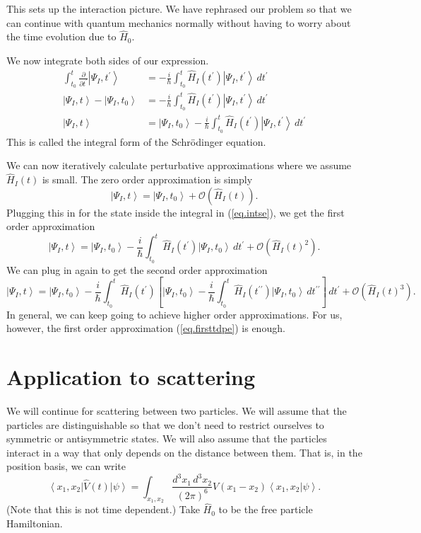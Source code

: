 \documentclass[11pt]{article}
\newcommand{\Od}[1]{\mathcal{O}{\left(#1\right)}}
\newcommand{\bra}[1]{\left\langle#1\right|}
\newcommand{\ket}[1]{\left|#1\right\rangle}
\newcommand{\braket}[2]{\left\langle#1|#2\right\rangle}
\newcommand{\op}[1]{\hat{#1}}
\theoremstyle{theorem}
\theoremstyle{remark}
\theoremstyle{step}
\theoremstyle{gap}
\begin{document}
This sets up the interaction picture. We have rephrased our problem so that we can continue with quantum mechanics normally without having to worry about the time evolution due to \(\op{H}_0\).

We now integrate both sides of our expression.
\begin{align}
\int_{t_0}^t \frac{\partial}{\partial t^\prime} \ket{\Psi_I, t^\prime} &= -\frac{i}{\hbar} \int_{t_0}^t \op{H}_I(t^\prime)\ket{\Psi_I, t^\prime} \,dt^\prime \nonumber\\
\ket{\Psi_I, t} - \ket{\Psi_I, t_0} &= -\frac{i}{\hbar} \int_{t_0}^t \op{H}_I(t^\prime)\ket{\Psi_I, t^\prime} \,dt^\prime \nonumber\\
\ket{\Psi_I, t} &= \ket{\Psi_I, t_0} - \frac{i}{\hbar} \int_{t_0}^t \op{H}_I(t^\prime)\ket{\Psi_I, t^\prime} \,dt^\prime \label{eq.intse}
\end{align}
This is called the integral form of the Schr\"odinger equation.

We can now iteratively calculate perturbative approximations where we assume \(\op{H}_I(t)\) is small. The zero order approximation is simply
\[\ket{\Psi_I, t} = \ket{\Psi_I, t_0} + \Od{\op{H}_I(t)}.\]
Plugging this in for the state inside the integral in (\ref{eq.intse}), we get the first order approximation
\begin{equation}\label{eq.firsttdpe}
\ket{\Psi_I, t} = \ket{\Psi_I, t_0} - \frac{i}{\hbar} \int_{t_0}^t \op{H}_I(t^\prime)\ket{\Psi_I, t_0} \,dt^\prime + \Od{\op{H}_I(t)^2}.
\end{equation}
We can plug in again to get the second order approximation
\[
\ket{\Psi_I, t} = \ket{\Psi_I, t_0} - \frac{i}{\hbar} \int_{t_0}^t \op{H}_I(t^\prime)\left[\ket{\Psi_I, t_0} - \frac{i}{\hbar} \int_{t_0}^t \op{H}_I(t^{\prime\prime})\ket{\Psi_I, t_0} \,dt^{\prime\prime}\right] \,dt^\prime + \Od{\op{H}_I(t)^3}.
\]
In general, we can keep going to achieve higher order approximations. For us, however, the first order approximation (\ref{eq.firsttdpe}) is enough.

\section{Application to scattering}

We will continue for scattering between two particles. We will assume that the particles are distinguishable so that we don't need to restrict ourselves to symmetric or antisymmetric states. We will also assume that the particles interact in a way that only depends on the distance between them. That is, in the position basis, we can write \[\bra{x_1, x_2}\op{V}(t)\ket{\psi} = \int_{x_1,x_2} \frac{d^3 x_1 \,d^3x_2}{(2\pi)^6} V(x_1 - x_2) \braket{x_1, x_2}{\psi}.\] (Note that this is not time dependent.) Take \(\op{H}_0\) to be the free particle Hamiltonian.
\end{document}
